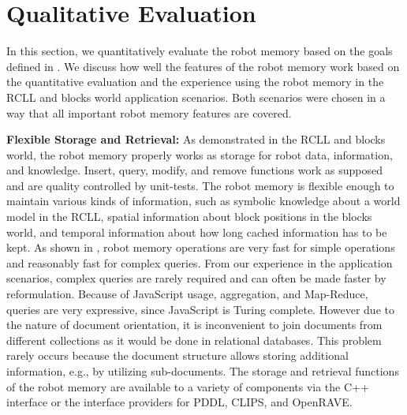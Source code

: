 \section{Qualitative Evaluation}
\label{sec:qualitative}
In this section, we quantitatively evaluate the robot memory based on
the goals defined in . We discuss how well the
features of the robot memory work based on the quantitative evaluation
and the experience using the robot memory in the RCLL and
blocks world application scenarios. Both scenarios were chosen in a
way that all important robot memory features are covered.

\textbf{Flexible Storage and Retrieval:}
As demonstrated in the RCLL and blocks world, the robot memory
properly works as storage for robot data, information,
and knowledge. Insert, query, modify, and remove functions work as
supposed and are quality controlled by unit-tests. The robot memory is flexible
enough to maintain various kinds of information, such as symbolic knowledge
about a world model in the RCLL, spatial information about block
positions in the blocks world, and temporal information about how long
cached information has to be kept. As shown in
, robot memory operations are very fast for
simple operations and reasonably fast for complex queries.
From our experience in the application scenarios, complex
queries are rarely required and can often be made faster by
reformulation.  Because of JavaScript usage, aggregation, and
Map-Reduce, queries are very expressive, since JavaScript is Turing
complete. However due to the nature of document orientation, it is
inconvenient to join documents from different collections as it would
be done in relational databases. This problem rarely occurs because
the document structure allows
storing additional information, e.g., by utilizing sub-documents.
The storage and retrieval functions of the robot memory are available
to a variety of components via the C++ interface or the interface
providers for PDDL, CLIPS, and OpenRAVE.

